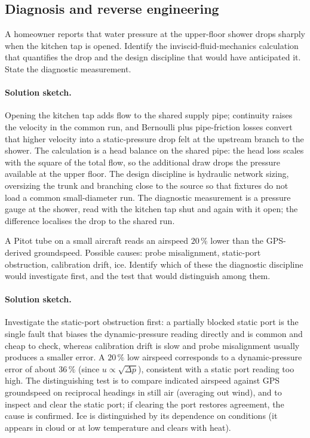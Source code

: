 \subsection*{Diagnosis and reverse engineering}

\begin{exercise}
A homeowner reports that water pressure at the upper-floor shower
drops sharply when the kitchen tap is opened. Identify the
inviscid-fluid-mechanics calculation that quantifies the drop and
the design discipline that would have anticipated it. State the
diagnostic measurement.

\paragraph{Solution sketch.} Opening the kitchen tap adds flow to the
shared supply pipe; continuity raises the velocity in the common run,
and Bernoulli plus pipe-friction losses convert that higher velocity
into a static-pressure drop felt at the upstream branch to the shower.
The calculation is a head balance on the shared pipe: the head loss
scales with the square of the total flow, so the additional draw drops
the pressure available at the upper floor. The design discipline is
hydraulic network sizing, oversizing the trunk and branching close to
the source so that fixtures do not load a common small-diameter run.
The diagnostic measurement is a pressure gauge at the shower, read
with the kitchen tap shut and again with it open; the difference
localises the drop to the shared run.
\end{exercise}

\begin{exercise}
A Pitot tube on a small aircraft reads an airspeed $20\,\%$ lower
than the GPS-derived groundspeed. Possible causes: probe misalignment,
static-port obstruction, calibration drift, ice. Identify which of
these the diagnostic discipline would investigate first, and the
test that would distinguish among them.

\paragraph{Solution sketch.} Investigate the static-port obstruction
first: a partially blocked static port is the single fault that biases
the dynamic-pressure reading directly and is common and cheap to
check, whereas calibration drift is slow and probe misalignment
usually produces a smaller error. A $20\,\%$ low airspeed corresponds
to a dynamic-pressure error of about $36\,\%$ (since $u\propto
\sqrt{\Delta p}$), consistent with a static port reading too high.
The distinguishing test is to compare indicated airspeed against GPS
groundspeed on reciprocal headings in still air (averaging out wind),
and to inspect and clear the static port; if clearing the port
restores agreement, the cause is confirmed. Ice is distinguished by
its dependence on conditions (it appears in cloud or at low
temperature and clears with heat).
\end{exercise}

